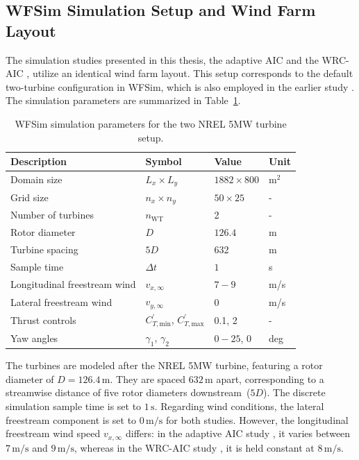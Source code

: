 \subsection{WFSim Simulation Setup and Wind Farm Layout}
The simulation studies presented in this thesis, the adaptive AIC \cite{dittmer2022data} and the WRC-AIC \cite{dittmer2023koopman}, utilize an identical wind farm layout. This setup corresponds to the default two-turbine configuration in WFSim, which is also employed in the earlier study \cite{sharan2022Koopman}. The simulation parameters are summarized in Table~\ref{table:WfSim}. 
%
\begin{table}[ht]
    \centering
    \caption{WFSim simulation parameters for the two NREL 5MW turbine setup.}
    \label{table:WfSim}
    \begin{tabular}{l l l l} 
        \toprule
        Description & Symbol & Value & Unit\\
        \midrule
        Domain size &$L_x\times L_y$ & $1882\times 800$& $\text{m}^2$ \\
        Grid size  &$n_x\times n_y$ & $50\times 25$ & -\\
        Number of turbines& $n_{\text{WT}}$ & 2 & - \\
        Rotor diameter & $D$  & $126.4$& m \\
        Turbine spacing & $5D$ & 632 & m\\
        Sample time &$\Delta t$ & $1$ & s \\
        Longitudinal freestream wind &$v_{x,\infty}$&  $7 - 9$ & m/s \\
        Lateral freestream wind &$v_{y,\infty}$  & $0$ & m/s \\         
        Thrust controls & $C^{\prime}_{T,\text{min}}$, $C^{\prime}_{T,\text{max}}$ & 0.1, 2 & -\\
        Yaw angles &$\gamma_1$, $\gamma_2$ &  $0 - 25$, $0$ & deg\\
        \bottomrule
    \end{tabular}
\end{table}
%
The turbines are modeled after the NREL 5MW turbine, featuring a rotor diameter of $D = 126.4\,\text{m}$. They are spaced $632\,\text{m}$ apart, corresponding to a streamwise distance of five rotor diameters downstream~($5D$). The discrete simulation sample time is set to $1\,\text{s}$. Regarding wind conditions, the lateral freestream component is set to $0\,\text{m/s}$ for both studies. However, the longitudinal freestream wind speed $v_{x,\infty}$ differs: in the adaptive AIC study \cite{dittmer2022data}, it varies between $7\,\text{m/s}$ and $9\,\text{m/s}$, whereas in the WRC-AIC study \cite{dittmer2023koopman}, it is held constant at $8\,\text{m/s}$.

